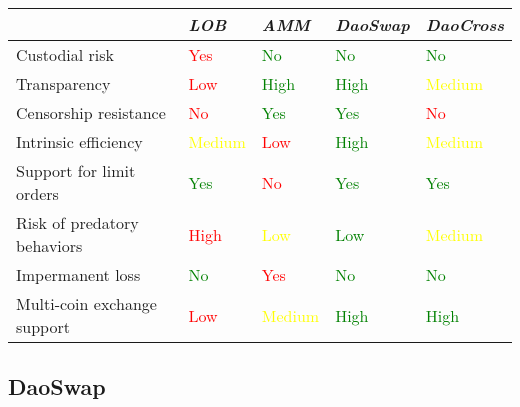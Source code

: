 \documentclass[11pt, reqno]{amsart}
\theoremstyle{definition}
\theoremstyle{remark}
\begin{document}
\begin{samepage}
	\begin{table}[h!]
		\centering
		\begin{tabular}{lllll}
			                            & \emph{LOB} & \emph{AMM} & \emph{DaoSwap} & \emph{DaoCross} \\
			\hline
            Custodial risk              & \textcolor{red}{Yes}        & \textcolor{green}{No} & \textcolor{green}{No} & \textcolor{green}{No}  \\
            Transparency                & \textcolor{red}{Low}        & \textcolor{green}{High}       & \textcolor{green}{High}           & \textcolor{yellow}{Medium} \\
            Censorship resistance       & \textcolor{red}{No}         & \textcolor{green}{Yes} & \textcolor{green}{Yes} & \textcolor{red}{No} \\
            Intrinsic efficiency        & \textcolor{yellow}{Medium}     & \textcolor{red}{Low}        & \textcolor{green}{High} & \textcolor{yellow}{Medium}          \\
            Support for limit orders    & \textcolor{green}{Yes} & \textcolor{red}{No} & \textcolor{green}{Yes}            & \textcolor{green}{Yes} \\
            Risk of predatory behaviors & \textcolor{red}{High} & \textcolor{yellow}{Low} & \textcolor{green}{Low}       & \textcolor{yellow}{Medium} \\
            Impermanent loss            & \textcolor{green}{No}         & \textcolor{red}{Yes} & \textcolor{green}{No}             & \textcolor{green}{No}              \\
            Multi-coin exchange support & \textcolor{red}{Low} & \textcolor{yellow}{Medium} & \textcolor{green}{High} & \textcolor{green}{High} \\
			\hline
		\end{tabular}
	\end{table}
\end{samepage}

\subsection{DaoSwap}
\end{document}
